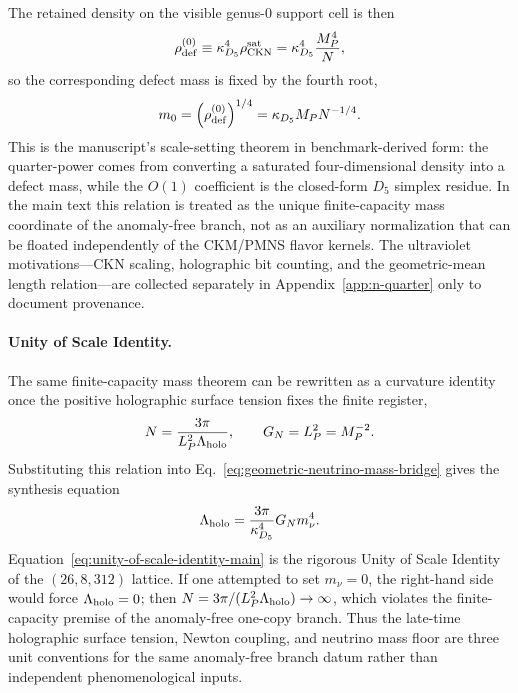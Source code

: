 \documentclass[11pt]{article}
\begin{document}
The retained density on the visible genus-$0$ support cell is then
\begin{equation}
 \rho_{\rm def}^{(0)}
 \equiv
 \kappa_{D_5}^4\rho_{\rm CKN}^{\rm sat}
 =
 \kappa_{D_5}^4\frac{M_P^4}{N},
\end{equation}
so the corresponding defect mass is fixed by the fourth root,
\begin{equation}
 m_0
 =
 \left(\rho_{\rm def}^{(0)}\right)^{1/4}
 =
 \kappa_{D_5}M_PN^{-1/4}.
 \label{eq:geometric-neutrino-mass-bridge}
\end{equation}
This is the manuscript's scale-setting theorem in benchmark-derived form: the quarter-power comes from converting a saturated four-dimensional density into a defect mass, while the $O(1)$ coefficient is the closed-form $D_5$ simplex residue. In the main text this relation is treated as the unique finite-capacity mass coordinate of the anomaly-free branch, not as an auxiliary normalization that can be floated independently of the CKM/PMNS flavor kernels. The ultraviolet motivations---CKN scaling, holographic bit counting, and the geometric-mean length relation---are collected separately in Appendix~\ref{app:n-quarter} only to document provenance.

\paragraph{Unity of Scale Identity.}
The same finite-capacity mass theorem can be rewritten as a curvature identity once the positive holographic surface tension fixes the finite register,
\begin{equation}
 N=\frac{3\pi}{L_P^2\Lambda_{\rm holo}},
 \qquad
 G_N=L_P^2=M_P^{-2}.
\end{equation}
Substituting this relation into Eq.~\eqref{eq:geometric-neutrino-mass-bridge} gives the synthesis equation
\begin{equation}
\label{eq:unity-of-scale-identity-main}
 \Lambda_{\rm holo}
 =
 \frac{3\pi}{\kappa_{D_5}^4}
 G_N m_\nu^4.
\end{equation}
Equation~\eqref{eq:unity-of-scale-identity-main} is the rigorous Unity of Scale Identity of the $(26,8,312)$ lattice. If one attempted to set $m_\nu=0$, the right-hand side would force $\Lambda_{\rm holo}=0$; then $N=3\pi/(L_P^2\Lambda_{\rm holo})\to\infty$, which violates the finite-capacity premise of the anomaly-free one-copy branch. Thus the late-time holographic surface tension, Newton coupling, and neutrino mass floor are three unit conventions for the same anomaly-free branch datum rather than independent phenomenological inputs.
\end{document}
